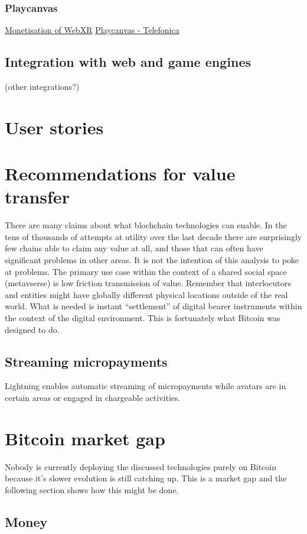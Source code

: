 \subsubsection{Playcanvas}
\href{https://hackmd.io/@XR/monetization}{Monetisation of WebXR}
\href{https://github.com/playcanvas/engine}{Playcanvas - Telefonica}
\lipsum[50]
\subsection{Integration with web and game engines} (other integrations?) 
\section{User stories}
\lipsum[50]
\section{Recommendations for value transfer}
There are many claims about what blochchain technologies can enable. In the tens of thousands of attempts at utility over the last decade there are surprisingly few chains able to claim any value at all, and those that can often have significant problems in other areas. It is not the intention of this analysis to poke at problems. The primary use case within the context of a shared social space (metavserse) is low friction transmission of value. Remember that interlocutors and entities might have globally different physical locations outside of the real world. What is needed is instant ``settlement'' of digital bearer instruments within the context of the digital environment. This is fortunately what Bitcoin was designed to do. 
\subsection{Streaming micropayments}
Lightning enables automatic streaming of micropayments while avatars are in certain areas or engaged in chargeable activities.

\section{Bitcoin market gap}
Nobody is currently deploying the discussed technologies purely on Bitcoin because it's slower evolution is still catching up. This is a market gap and the following section shows how this might be done.
\subsection{Money}
\lipsum[50]
